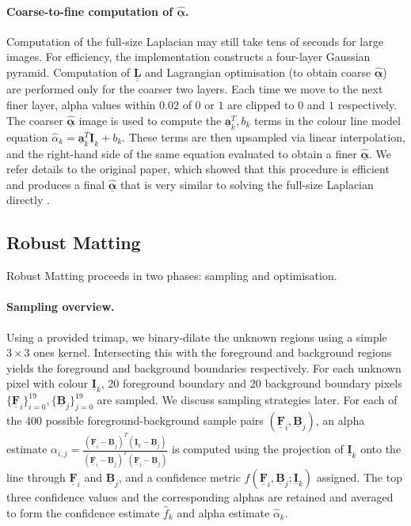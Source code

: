 \documentclass{article}
\theoremstyle{definition}
\def\vt#1{\underline{\mathbf{#1}}}
\def\vts#1{\underline{\boldsymbol{#1}}}
\def\mt#1{\underline{\underline{\mathbf{#1}}}}
\begin{document}
\begin{multicols}{2}[]
\paragraph{Coarse-to-fine computation of $\hat{\vts\alpha}$.} Computation of the full-size Laplacian may still take tens of seconds for large images. For efficiency, the implementation constructs a four-layer Gaussian pyramid. Computation of $\mt L$ and Lagrangian optimisation (to obtain coarse $\hat{\vts\alpha}$) are performed only for the coarser two layers. Each time we move to the next finer layer, alpha values within $0.02$ of $0$ or $1$ are clipped to $0$ and $1$ respectively. The coarser $\hat{\vts\alpha}$ image is used to compute the $\vt a_k^T, b_k$ terms in the colour line model equation $\hat\alpha_k = \vt a_k^T \vt I_k + b_k$. These terms are then upsampled via linear interpolation, and the right-hand side of the same equation evaluated to obtain a finer $\hat{\vts\alpha}$. We refer details to the original paper, which showed that this procedure is efficient and produces a final $\hat{\vts\alpha}$ that is very similar to solving the full-size Laplacian directly \cite[\S4]{closed-form-matting}.





\subsection{Robust Matting}
Robust Matting proceeds in two phases: sampling and optimisation.

\paragraph{Sampling overview.} Using a provided trimap, we binary-dilate the unknown regions using a simple $3\times 3$ ones kernel. Intersecting this with the foreground and background regions yields the foreground and background boundaries respectively. For each unknown pixel with colour $\vt I_k$, 20 foreground boundary and 20 background boundary pixels $\{\vt F_i\}_{i=0}^{19}, \{\vt B_j\}_{j=0}^{19}$ are sampled. We discuss sampling strategies later. For each of the 400 possible foreground-background sample pairs $(\vt F_i, \vt B_j)$, an alpha estimate $\alpha_{i,j} = \frac{\left(\vt F_i - \vt B_j\right)^T\left(\vt I_k - \vt B_j\right)}{\left(\vt F_i - \vt B_j\right)^T\left(\vt F_i - \vt B_j\right)}$ is computed using the projection of $\vt I_k$ onto the line through $\vt F_i$ and $\vt B_j$, and a confidence metric $f(\vt F_i, \vt B_j; \vt I_k)$ assigned. The top three confidence values and the corresponding alphas are retained and averaged to form the confidence estimate $\hat f_k$ and alpha estimate $\hat{\alpha}_k$.


\end{multicols}
\end{document}
